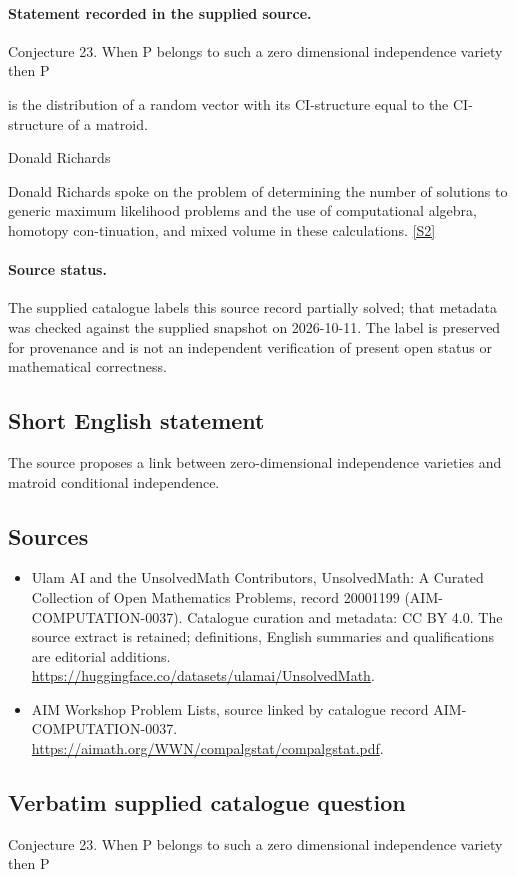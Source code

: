 \documentclass[11pt]{article}
\begin{document}
\paragraph{Statement recorded in the supplied source.}
Conjecture 23. When P belongs to such a zero dimensional independence variety then P

is the distribution of a random vector with its CI-structure equal to the CI-structure of a matroid.

Donald Richards

Donald Richards spoke on the problem of determining the number of solutions to generic maximum likelihood problems and the use of computational algebra, homotopy con-tinuation, and mixed volume in these calculations. \href{https://aimath.org/WWN/compalgstat/compalgstat.pdf}{[S2]}
\paragraph{Source status.}
The supplied catalogue labels this source record partially solved; that metadata was checked against the supplied snapshot on 2026-10-11. The label is preserved for provenance and is not an independent verification of present open status or mathematical correctness.
\subsection{Short English statement}
The source proposes a link between zero-dimensional independence varieties and matroid conditional independence.
\subsection{Sources}
\begin{itemize}
\item[S1] Ulam AI and the UnsolvedMath Contributors, UnsolvedMath: A Curated Collection of Open Mathematics Problems, record 20001199 (AIM-COMPUTATION-0037). Catalogue curation and metadata: CC BY 4.0. The source extract is retained; definitions, English summaries and qualifications are editorial additions.
\url{https://huggingface.co/datasets/ulamai/UnsolvedMath}.
\item[S2] AIM Workshop Problem Lists, source linked by catalogue record AIM-COMPUTATION-0037.
\url{https://aimath.org/WWN/compalgstat/compalgstat.pdf}.
\end{itemize}
\subsection{Verbatim supplied catalogue question}
Conjecture 23. When P belongs to such a zero dimensional independence variety then P
\end{document}
